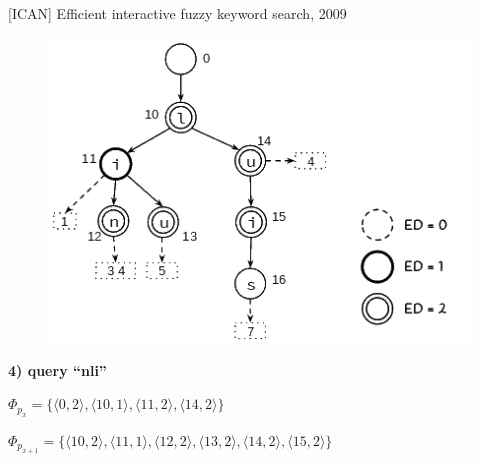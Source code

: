 \documentclass[11pt]{beamer}
\begin{document}
\begin{frame}{[ICAN] Efficient interactive fuzzy keyword search, 2009}

    \begin{figure}
      \includegraphics[scale=0.45]{pictures/ican_5.png}
      \centering
    \end{figure}
    
    \textbf{4) query ``nli''}
    
    $\Phi_{p_x} = \big\{ \big \langle 0, 2 \big \rangle, \big \langle 10, 1 \big \rangle, \big \langle 11, 2 \big \rangle, \big \langle 14, 2 \big \rangle \big\}$
    
    $\Phi_{p_{x+1}} = \big\{ \big \langle 10, 2 \big \rangle, \big \langle 11, 1 \big \rangle, \big \langle 12, 2 \big \rangle, \big \langle 13, 2 \big \rangle, \big \langle 14, 2 \big \rangle, \big \langle 15, 2 \big \rangle \big\}$
    
\end{frame}
\end{document}

